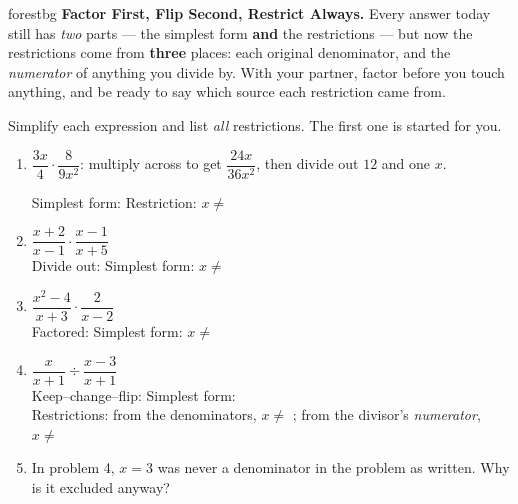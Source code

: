 \documentclass[10pt]{article}
\begin{document}
\namepartnerperiod

\vspace{0.08in}

\begin{headlinebox}{forestbg}
\small\textbf{Factor First, Flip Second, Restrict Always.} Every answer today still has \emph{two}
parts --- the simplest form \textbf{and} the restrictions --- but now the restrictions come from
\textbf{three} places: each original denominator, and the \emph{numerator} of anything you divide by.
With your partner, factor before you touch anything, and be ready to say which source each restriction
came from.
\end{headlinebox}

\vspace{0.06in}

\begin{tcolorbox}[colback=white, colframe=black!40, title=\textbf{Tier R --- Remediate},
    fonttitle=\bfseries, arc=1.5mm, left=3mm, right=3mm, top=2mm, bottom=2mm, breakable]
Simplify each expression and list \emph{all} restrictions. The first one is started for you.

\vspace{4pt}
\begin{enumerate}[leftmargin=1.9em, itemsep=9pt]
  \item $\dfrac{3x}{4}\cdot\dfrac{8}{9x^2}$: \; multiply across to get $\dfrac{24x}{36x^2}$, then
        divide out $12$ and one $x$.

        Simplest form: \blank{2.2cm} \quad Restriction: $x\neq$ \blank{1.0cm}
  \item $\dfrac{x+2}{x-1}\cdot\dfrac{x-1}{x+5}$ \\[3pt]
        Divide out: \blank{2.0cm} \quad Simplest form: \blank{2.0cm} \quad
        $x\neq$ \blank{1.8cm}
  \item $\dfrac{x^2-4}{x+3}\cdot\dfrac{2}{x-2}$ \\[3pt]
        Factored: \blank{4.0cm} \quad Simplest form: \blank{2.2cm} \quad
        $x\neq$ \blank{1.8cm}
  \item $\dfrac{x}{x+1}\div\dfrac{x-3}{x+1}$ \\[3pt]
        Keep--change--flip: \blank{4.0cm} \quad Simplest form: \blank{2.0cm} \\[3pt]
        Restrictions: from the denominators, $x\neq$ \blank{1.2cm}; \; from the divisor's
        \emph{numerator}, $x\neq$ \blank{1.2cm}
  \item In problem 4, $x=3$ was never a denominator in the problem as written. Why is it excluded
        anyway? \blank{6.2cm}
\end{enumerate}
\end{tcolorbox}
\end{document}
